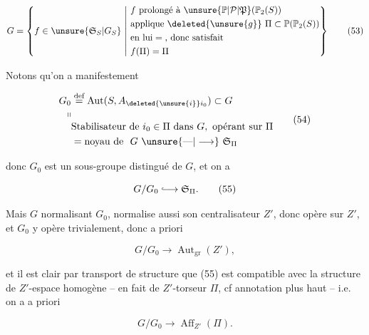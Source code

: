 
\[
 G=\left\{f\in\unsure{\mathfrak S_S|G_S}\ \middle|\
 \begin{aligned}
 &f\text{ prolongé à }\unsure{\mathbb P|\mathcal P|\mathfrak P}(\mathbb P_2(S))\\
 &\text{applique }\deleted{\unsure{g}}\ \Pi\subset\mathbb P(\mathbb P_2(S))\\
 &\text{en lui}=\text{, donc satisfait}\\
 &f(\Pi)=\Pi
 \end{aligned}\right\} \tag*{(53)}
\]


  Notons qu'on a manifestement

\[
\begin{aligned}
G_0&\overset{\text{def}}{=}\operatorname{Aut}(S,A_{\deleted{\unsure{i}}i_0})\subset G\\[-2pt]
\shortparallel&\\[-2pt]
&\text{Stabilisateur de }i_0\in\Pi\text{ dans }G,\text{ opérant sur }\Pi\\
&=\text{noyau de }\ G\ \unsure{\text{---}|\longrightarrow}\ \mathfrak S_\Pi
\end{aligned}\tag*{(54)}
\]

donc $G_0$ est un sous-groupe distingué de $G$, et on a

\[
G/G_0\lhook\joinrel\longrightarrow\mathfrak S_\Pi. \tag*{(55)}
\]

Mais $G$ normalisant $G_0$, normalise aussi son centralisateur $Z'$, donc opère sur $Z'$, et $G_0$ y opère trivialement, donc a priori

\[
G/G_0\longrightarrow\operatorname{Aut}_{\mathrm{gr}}(Z'), \tag*{(56)}
\]

et il est clair par transport de structure que (55) est compatible avec la structure de $Z'$-espace homogène  -- en fait de $Z'$-torseur $\Pi$, cf annotation plus haut -- i.e. on a a priori

\[
G/G_0\longrightarrow\operatorname{Aff}_{Z'}(\Pi). \tag*{(57)}
\]
